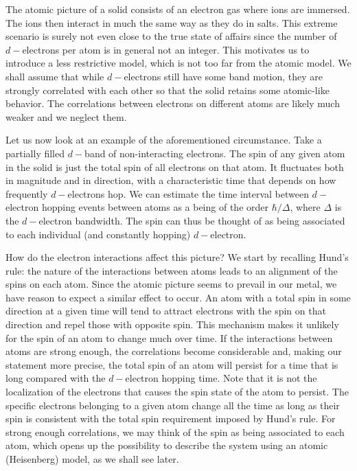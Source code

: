 The atomic picture of a solid consists of an electron gas where ions are immersed.
The ions then interact in much the same way as they do in salts.
This extreme scenario is surely not even close to the true state of affairs since the number of $d-$electrons per atom is in general not an integer.
This motivates us to introduce a less restrictive model, which is not too far from the atomic model.
We shall assume that while $d-$electrons still have some band motion, they are strongly correlated with each other so that the solid retains some atomic-like behavior.
The correlations between electrons on different atoms are likely much weaker and we neglect them.

Let us now look at an example of the aforementioned circumstance.
Take a partially filled $d-$band of non-interacting electrons.
The spin of any given atom in the solid is just the total spin of all electrons on that atom.
It fluctuates both in magnitude and in direction, with a characteristic time that depends on how frequently $d-$electrons hop.
We can estimate the time interval between $d-$electron hopping events between atoms as a being of the order $\hbar / \Delta$, where $\Delta$ is the $d-$electron bandwidth.
The spin can thus be thought of as being associated to each individual (and constantly hopping) $d-$electron.

How do the electron interactions affect this picture?
We start by recalling Hund's rule: the nature of the  interactions between atoms leads to an alignment of the spins on each atom.
Since the atomic picture seems to prevail in our metal, we have reason to expect a similar effect to occur.
An atom with a total spin in some direction at a given time will tend to attract electrons with the spin on that direction and repel those with opposite spin.
This mechanism makes it unlikely for the spin of an atom to change much over time.
If the interactions between atoms are strong enough, the correlations become considerable and, making our statement  more precise, the total spin of an atom will persist for a time that is long compared with the $d-$electron hopping time.
Note that it is not the localization of the electrons that causes the spin state of the atom to persist.
The specific electrons belonging to a given atom change all the time as long as their spin is consistent with the total spin requirement imposed by Hund's rule.
For strong enough correlations, we may think of the spin as being associated to each atom, which opens up the possibility to describe the system using an atomic (Heisenberg) model, as we shall see later.

